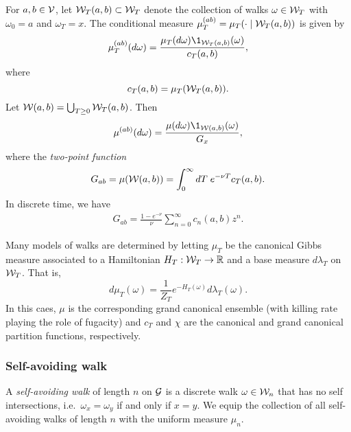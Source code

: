 For $a, b \in \mathcal{V}$, let $\mathcal{W}_T(a, b) \subset \mathcal{W}_T$ denote the collection of walks
$\omega \in \mathcal{W}_T$ with $\omega_0 = a$ and $\omega_T = x$.
The conditional measure $\mu^{(ab)}_T = \mu_T(\cdot \mid \mathcal{W}_T(a, b))$
is given by
\begin{equation}
\mu^{(ab)}_T(d\omega) = \frac{\mu_T(d\omega) \1_{\Wcal_T(a, b)}(\omega)}{c_T(a, b)},
\end{equation}
where
\begin{equation}
c_T(a, b) = \mu_T(\mathcal{W}_T(a, b)).
\end{equation}
Let $\mathcal{W}(a, b) = \bigcup_{T \ge 0} \mathcal{W}_T(a, b)$. Then
\begin{equation}
\mu^{(ab)}(d\omega) = \frac{\mu(d\omega) \1_{\Wcal(a, b)}(\omega)}{G_x},
\end{equation}
where the \emph{two-point function}
\begin{equation}
G_{ab} = \mu(\mathcal{W}(a, b)) = \int_0^\infty dT \; e^{-\nu T} c_T(a, b).
\end{equation}
In discrete time, we have
\begin{align}
G_{ab} = \frac{1 - e^{-\nu}}{\nu} \sum_{n=0}^\infty c_n(a, b) z^n.
\end{align}

Many models of walks are determined by letting $\mu_T$ be the canonical Gibbs measure
associated to a Hamiltonian $H_T : \mathcal{W}_T \rightarrow {\mathbb R}$ and a base measure $d\lambda_T$ on $\mathcal{W}_T$.
That is,
\begin{equation}
d\mu_T(\omega) = \frac{1}{Z_T} e^{-H_T(\omega)} d\lambda_T(\omega).
\end{equation}
In this caes, $\mu$ is the corresponding grand canonical ensemble (with killing rate playing
the role of fugacity) and $c_T$ and $\chi$
are the canonical and grand canonical partition functions, respectively.



\subsubsection{Self-avoiding walk}

A \emph{self-avoiding walk} of length $n$ on $\mathcal{G}$ is a discrete walk $\omega\in\mathcal{W}_n$
that has no self intersections, i.e.\ $\omega_x = \omega_y$ if and only if $x = y$.
We equip the collection of all self-avoiding walks of length $n$ with the uniform measure $\mu_n$.


